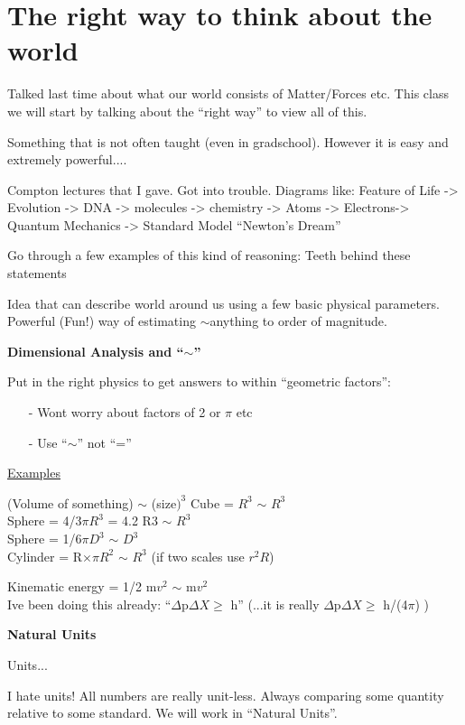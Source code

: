 {\fontsize{14}{16}\selectfont

\section*{The right way to think about the world}

Talked last time about what our world consists of Matter/Forces etc.
This class we will start by talking about the ``right way'' to view all of this. 

Something that is not often taught (even in gradschool).
However it is easy and extremely powerful....

Compton lectures that I gave. 
Got into trouble. 
Diagrams like: 
Feature of Life -> Evolution -> DNA -> molecules -> chemistry  -> Atoms ->  Electrons-> Quantum Mechanics -> Standard Model
``Newton's Dream''

Go through a few examples of this kind of reasoning:
Teeth behind these statements

Idea that can describe world around us using a few basic physical parameters.
Powerful (Fun!) way of estimating $\sim$anything to order of magnitude.

\textbf{Dimensional Analysis and ``$\sim$''}

Put in the right physics to get answers to within ``geometric factors'':
\begin{itemize}
\item[-] Wont worry about factors of 2 or $\pi$ etc
\item[-] Use ``$\sim$'' not ``=''
\end{itemize}

\underline{Examples}

(Volume of something) $\sim$ (size$)^3$
Cube = $R^{3}$ $\sim$ $R^3$\\
Sphere = 4/3$\pi R^3$ = 4.2 R3 $\sim$ $R^3$\\
Sphere = 1/6$\pi D^3$  $\sim$ $D^3$\\
Cylinder = R$\times\pi R^{2}$  $\sim$ $R^3$  (if two scales use $r^2R$) 

Kinematic energy = 1/2 m$v^2$ $\sim$ m$v^2$\\
Ive been doing this already: ``$\Delta$p$\Delta X \geq $ h''
(...it is really $\Delta$p$\Delta X \geq $ h/(4$\pi$) )

\textbf{Natural Units}

Units...

I hate units! All numbers are really unit-less.
Always comparing some quantity relative to some standard. 
We will work in “Natural Units”.

}
